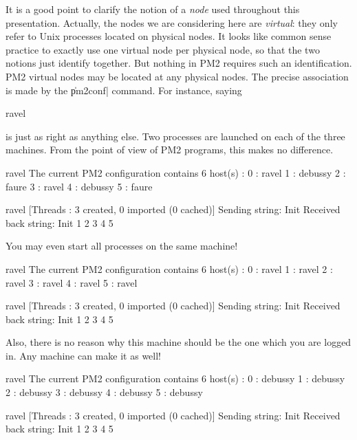 It is a good point to clarify the notion of a \emph{node} used
throughout this presentation. Actually, the nodes we are considering
here are \emph{virtual}: they only refer to Unix processes located on
physical nodes. It looks like common sense practice to exactly use one
virtual node per physical node, so that the two notions just identify
together. But nothing in PM2 requires such an identification. PM2
virtual nodes may be located at any physical nodes. The precise
association is made by the \|pm2conf| command. For instance, saying
\begin{shell}
ravel%
\end{shell}
is just as right as anything else. Two processes are launched on each
of the three machines. From the point of view of PM2 programs, this
makes no difference.
\begin{shell}
ravel%
The current PM2 configuration contains 6 host(s) :
0 : ravel
1 : debussy
2 : faure
3 : ravel
4 : debussy
5 : faure

ravel%
[Threads : 3 created, 0 imported (0 cached)]
Sending string: Init
Received back string: Init 1 2 3 4 5
\end{shell}
You may even start all processes on the same machine!
\begin{shell}
ravel%
The current PM2 configuration contains 6 host(s) :
0 : ravel
1 : ravel
2 : ravel
3 : ravel
4 : ravel
5 : ravel

ravel%
[Threads : 3 created, 0 imported (0 cached)]
Sending string: Init
Received back string: Init 1 2 3 4 5
\end{shell}
Also, there is no reason why this machine should be the one which you
are logged in. Any machine can make it as well!
\begin{shell}
ravel%
The current PM2 configuration contains 6 host(s) :
0 : debussy
1 : debussy
2 : debussy
3 : debussy
4 : debussy
5 : debussy

ravel%
[Threads : 3 created, 0 imported (0 cached)]
Sending string: Init
Received back string: Init 1 2 3 4 5
\end{shell}
